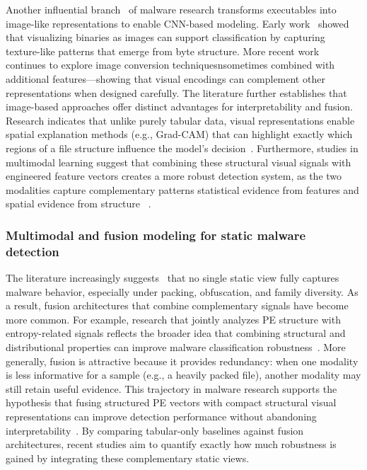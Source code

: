 \documentclass[conference]{IEEEtran}
\begin{document}
Another influential branch~\cite{NKJMB2011,KBSSSK2025} of malware research transforms executables into image-like representations to enable CNN-based modeling.
Early work~\cite{NKJMB2011} showed that visualizing binaries as images can support classification by capturing texture-like patterns that emerge from byte structure.
More recent work~\cite{ZLSC2024} continues to explore image conversion techniquesnsometimes combined with additional features---showing that visual encodings can complement other representations when designed carefully.
The literature further establishes that image-based approaches offer distinct advantages for interpretability and fusion.
Research indicates that unlike purely tabular data, visual representations enable spatial explanation methods (e.g., Grad-CAM) that can highlight exactly which regions of a file structure influence the model's decision~\cite{SCDVPB2017,ZLSC2024}.
Furthermore, studies in multimodal learning suggest that combining these structural visual signals with engineered feature vectors creates a more robust detection system, as the two modalities capture complementary patterns statistical evidence from features and spatial evidence from structure ~\cite{NKJMB2011,ZLSC2024}.

\subsubsection{Multimodal and fusion modeling for static malware detection}

The literature increasingly suggests~\cite{ZLSC2024,KBSSSK2025} that no single static view fully captures malware behavior, especially under packing, obfuscation, and family diversity.
As a result, fusion architectures that combine complementary signals have become more common.
For example, research that jointly analyzes PE structure with entropy-related signals reflects the broader idea that combining structural and distributional properties can improve malware classification robustness~\cite{SZS25}.
More generally, fusion is attractive because it provides redundancy: when one modality is less informative for a sample (e.g., a heavily packed file), another modality may still retain useful evidence.
This trajectory in malware research supports the hypothesis that fusing structured PE vectors with compact structural visual representations can improve detection performance without abandoning interpretability~\cite{SZS25,SCDVPB2017}.
By comparing tabular-only baselines against fusion architectures, recent studies aim to quantify exactly how much robustness is gained by integrating these complementary static views.
\end{document}
